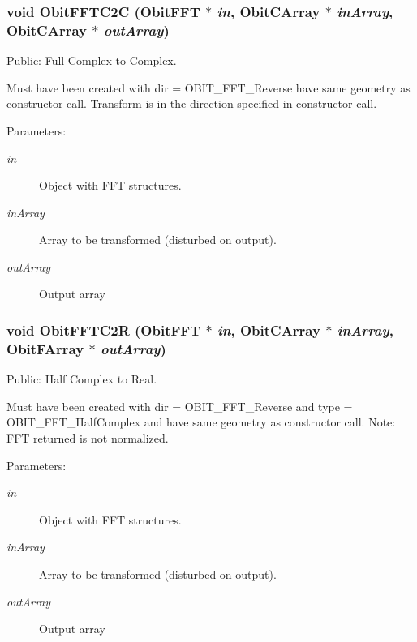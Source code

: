 \subsubsection{\setlength{\rightskip}{0pt plus 5cm}void Obit\-FFTC2C ({\bf Obit\-FFT} $\ast$ {\em in}, {\bf Obit\-CArray} $\ast$ {\em in\-Array}, {\bf Obit\-CArray} $\ast$ {\em out\-Array})}\label{ObitFFT_8c_a11}


Public: Full Complex to Complex. 

Must have been created with dir = OBIT\_\-FFT\_\-Reverse have same geometry as constructor call. Transform is in the direction specified in constructor call. \begin{Desc}
\item[Parameters:]
\begin{description}
\item[{\em in}]Object with FFT structures. \item[{\em in\-Array}]Array to be transformed (disturbed on output). \item[{\em out\-Array}]Output array \end{description}
\end{Desc}
\subsubsection{\setlength{\rightskip}{0pt plus 5cm}void Obit\-FFTC2R ({\bf Obit\-FFT} $\ast$ {\em in}, {\bf Obit\-CArray} $\ast$ {\em in\-Array}, {\bf Obit\-FArray} $\ast$ {\em out\-Array})}\label{ObitFFT_8c_a10}


Public: Half Complex to Real. 

Must have been created with dir = OBIT\_\-FFT\_\-Reverse and type = OBIT\_\-FFT\_\-Half\-Complex and have same geometry as constructor call. Note: FFT returned is not normalized. \begin{Desc}
\item[Parameters:]
\begin{description}
\item[{\em in}]Object with FFT structures. \item[{\em in\-Array}]Array to be transformed (disturbed on output). \item[{\em out\-Array}]Output array \end{description}
\end{Desc}
